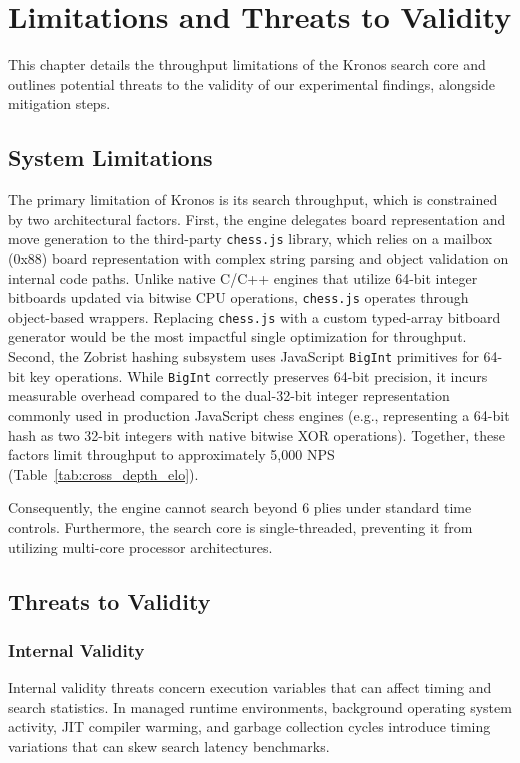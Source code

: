 \chapter{Limitations and Threats to Validity}
\label{ch:limitations}

This chapter details the throughput limitations of the Kronos search core and outlines potential threats to the validity of our experimental findings, alongside mitigation steps.

\section{System Limitations}
The primary limitation of Kronos is its search throughput, which is constrained by two architectural factors. First, the engine delegates board representation and move generation to the third-party \texttt{chess.js} library, which relies on a mailbox (0x88) board representation with complex string parsing and object validation on internal code paths. Unlike native C/C++ engines that utilize 64-bit integer bitboards updated via bitwise CPU operations, \texttt{chess.js} operates through object-based wrappers. Replacing \texttt{chess.js} with a custom typed-array bitboard generator would be the most impactful single optimization for throughput. Second, the Zobrist hashing subsystem uses JavaScript \texttt{BigInt} primitives for 64-bit key operations. While \texttt{BigInt} correctly preserves 64-bit precision, it incurs measurable overhead compared to the dual-32-bit integer representation commonly used in production JavaScript chess engines (e.g., representing a 64-bit hash as two 32-bit integers with native bitwise XOR operations). Together, these factors limit throughput to approximately 5,000 NPS (Table~\ref{tab:cross_depth_elo}).

Consequently, the engine cannot search beyond 6 plies under standard time controls. Furthermore, the search core is single-threaded, preventing it from utilizing multi-core processor architectures.

\section{Threats to Validity}

\subsection{Internal Validity}
Internal validity threats concern execution variables that can affect timing and search statistics. In managed runtime environments, background operating system activity, JIT compiler warming, and garbage collection cycles introduce timing variations that can skew search latency benchmarks.


